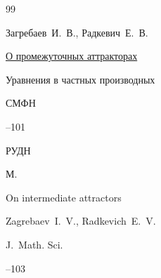 \begin{thebibliography}{99}






\by Загребаев~И.~В., Радкевич~Е.~В.

\paper \href{http://mi.mathnet.ru/cmfd174}{О промежуточных аттракторах}

\inbook Уравнения в частных производных

\serial СМФН



--101

\publ РУДН

\publaddr М.



\transl

\paper On intermediate attractors

\by Zagrebaev~I.~V., Radkevich~E.~V. 

\jour J.~Math. Sci.




--103




















\end{thebibliography}
